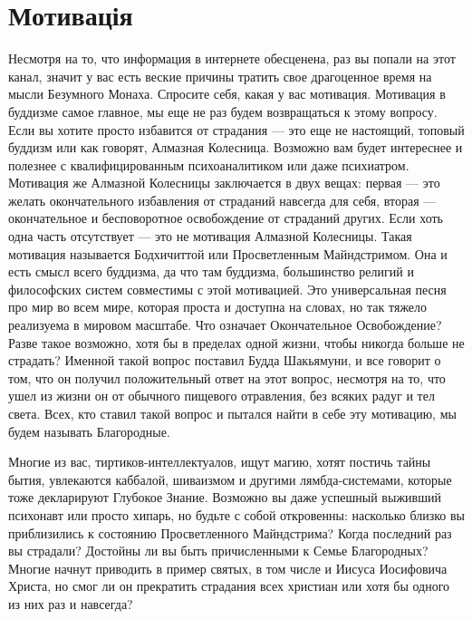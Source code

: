 \section{Мотивація}

Несмотря на то, что информация в интернете обесценена,
раз вы попали на этот канал, значит у вас есть веские
причины тратить свое драгоценное время на мысли Безумного
Монаха. Спросите себя, какая у вас мотивация. Мотивация
в буддизме самое главное, мы еще не раз будем возвращаться
к этому вопросу. Если вы хотите просто избавится от
страдания — это еще не настоящий, топовый буддизм или
как говорят, Алмазная Колесница. Возможно вам будет
интереснее и полезнее с квалифицированным психоаналитиком
или даже психиатром. Мотивация же Алмазной Колесницы
заключается в двух вещах: первая — это желать окончательного
избавления от страданий навсегда для себя, вторая —
окончательное и бесповоротное освобождение от страданий
других. Если хоть одна часть отсутствует — это не мотивация
Алмазной Колесницы. Такая мотивация называется Бодхичиттой
или Просветленным Майндстримом. Она и есть смысл всего
буддизма, да что там буддизма, большинство религий и
философских систем совместимы с этой мотивацией. Это
универсальная песня про мир во всем мире, которая проста
и доступна на словах, но так тяжело реализуема в мировом
масштабе. Что означает Окончательное Освобождение? Разве
такое возможно, хотя бы в пределах одной жизни, чтобы никогда
больше не страдать? Именной такой вопрос поставил Будда
Шакьямуни, и все говорит о том, что он получил положительный ответ на этот вопрос, несмотря на то, что ушел из жизни он от обычного пищевого отравления, без всяких радуг и тел света. Всех, кто ставил такой вопрос и пытался найти в себе эту мотивацию, мы будем называть Благородные.

Многие из вас, тиртиков-интеллектуалов, ищут магию, хотят постичь тайны бытия, увлекаются каббалой, шиваизмом и другими лямбда-системами, которые тоже декларируют Глубокое Знание. Возможно вы даже успешный выживший психонавт или просто хипарь, но будьте с собой откровенны: насколько близко вы приблизились к состоянию Просветленного Майндстрима? Когда последний раз вы страдали? Достойны ли вы быть причисленными к Семье Благородных? Многие начнут приводить в пример святых, в том числе и Иисуса Иосифовича Христа, но смог ли он прекратить страдания всех христиан или хотя бы одного из них раз и навсегда?

